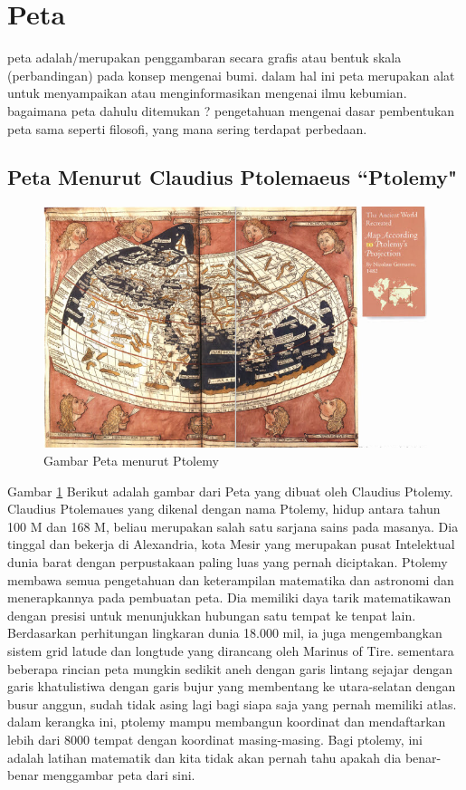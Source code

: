 ﻿%

\section{Peta}
	peta adalah/merupakan penggambaran secara grafis atau bentuk skala (perbandingan) pada konsep mengenai bumi. dalam hal ini peta merupakan alat untuk menyampaikan atau menginformasikan mengenai ilmu kebumian. bagaimana peta dahulu ditemukan ? pengetahuan mengenai dasar pembentukan peta sama seperti filosofi, yang mana sering terdapat perbedaan.

\subsection{Peta Menurut Claudius Ptolemaeus ``Ptolemy"}
	\begin{figure} [ht]
	\centerline{\includegraphics[width=1\textwidth]{figures/PetaPtolemy.PNG}}
	\caption{Gambar Peta menurut Ptolemy}
	\label{PetaPtolemy}
	\end{figure}
	Gambar \ref {PetaPtolemy} Berikut adalah gambar dari Peta yang dibuat oleh Claudius Ptolemy.
	Claudius Ptolemaues yang dikenal dengan nama Ptolemy, hidup antara tahun 100 M dan 168 M, beliau merupakan salah satu sarjana sains pada masanya. Dia tinggal dan bekerja di Alexandria, kota Mesir yang merupakan pusat Intelektual dunia barat dengan perpustakaan paling luas yang pernah diciptakan. Ptolemy membawa semua pengetahuan dan keterampilan matematika dan astronomi dan menerapkannya pada pembuatan peta. Dia memiliki daya tarik matematikawan dengan presisi untuk menunjukkan hubungan satu tempat ke tenpat lain. Berdasarkan perhitungan lingkaran dunia 18.000 mil, ia juga mengembangkan sistem grid latude dan longtude yang dirancang oleh Marinus of Tire. sementara beberapa rincian peta mungkin sedikit aneh dengan garis lintang sejajar dengan garis khatulistiwa dengan garis bujur yang membentang ke utara-selatan dengan busur anggun, sudah tidak asing lagi bagi siapa saja yang pernah memiliki atlas. dalam kerangka ini, ptolemy mampu membangun koordinat dan mendaftarkan lebih dari 8000 tempat dengan koordinat masing-masing. Bagi ptolemy, ini adalah latihan matematik dan kita tidak akan pernah tahu apakah dia benar-benar menggambar peta dari sini.
